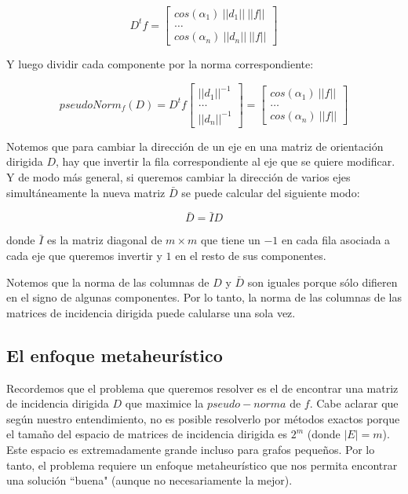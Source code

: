 \documentclass[10pt, a4paper, twocolumn]{article} %
\begin{document}
$$
D^t f = \begin{bmatrix}
	cos(\alpha_1) \ ||d_1|| \ ||f||\\
	\dots \\
	cos(\alpha_n) \ ||d_n|| \ ||f||
\end{bmatrix}
$$

\smallskip

Y luego dividir cada componente por la norma correspondiente:

$$
pseudoNorm_f(D) = D^t f
\begin{bmatrix}
	||d_1||^{-1}\\
	\dots \\
	||d_n||^{-1}
\end{bmatrix} = \begin{bmatrix}
	cos(\alpha_1) \ ||f||\\
	\dots \\
	cos(\alpha_n) \ ||f||
\end{bmatrix}
$$

\smallskip

Notemos que para cambiar la dirección de un eje en una matriz de 
orientación dirigida $D$, hay que invertir la fila correspondiente al 
eje que se quiere modificar. Y de modo más general, si queremos cambiar 
la dirección de varios ejes simultáneamente la nueva matriz $\bar{D}$
se puede calcular del siguiente modo:

$$\bar{D} = \bar{I} D$$

\smallskip

donde $\bar{I}$ es la matriz diagonal de $m \times m$ que tiene un $-1$ 
en cada fila asociada a cada eje que queremos invertir y $1$ en el resto 
de sus componentes.

\smallskip

Notemos que la norma de las columnas de $D$ y $\bar{D}$ son iguales 
porque sólo difieren en el signo de algunas componentes. Por lo tanto, 
la norma de las columnas de las matrices de incidencia dirigida puede 
calularse una sola vez.

\bigskip

\subsection{El enfoque metaheurístico}

Recordemos que el problema que queremos resolver es el de encontrar una 
matriz de incidencia dirigida $D$ que maximice la $pseudo-norma$ de $f$. 
Cabe aclarar que según nuestro entendimiento, no es posible resolverlo 
por métodos exactos porque el tamaño del espacio de matrices de 
incidencia dirigida es $2^m$  (donde 
$|E|=m$). Este espacio es extremadamente grande incluso para grafos 
pequeños. Por lo tanto, el problema requiere un enfoque metaheurístico 
que nos permita encontrar una solución ``buena" (aunque no 
necesariamente la mejor).
\end{document}
